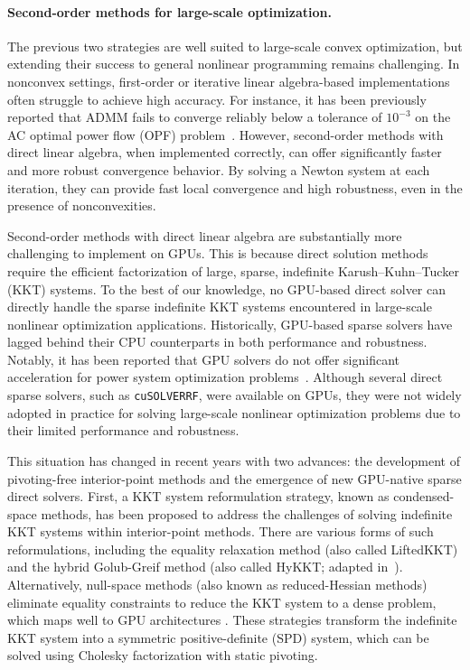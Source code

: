 \documentclass[smallextended]{svjour3}
\begin{document}
\paragraph{Second-order methods for large-scale optimization.}
The previous two strategies are well suited to large-scale convex optimization, but extending their success to general nonlinear programming remains challenging.
In nonconvex settings, first-order or iterative linear algebra-based implementations often struggle to achieve high accuracy.
For instance, it has been previously reported that ADMM fails to converge reliably below a tolerance of $10^{-3}$ on the AC optimal power flow (OPF) problem~\cite{kimLeveragingGPUBatching2021}.
However, second-order methods with direct linear algebra, when implemented correctly, can offer significantly faster and more robust convergence behavior.
By solving a Newton system at each iteration, they can provide fast local convergence and high robustness, even in the presence of nonconvexities.

Second-order methods with direct linear algebra are substantially more challenging to implement on GPUs.
This is because direct solution methods require the efficient factorization of large, sparse, indefinite Karush–Kuhn–Tucker (KKT) systems.
To the best of our knowledge, no GPU-based direct solver can directly handle the sparse indefinite KKT systems encountered in large-scale nonlinear optimization applications.
Historically, GPU-based sparse solvers have lagged behind their CPU counterparts in both performance and robustness.
Notably, it has been reported that GPU solvers do not offer significant acceleration for power system optimization problems~\cite{swirydowicz2021linear,tasseff2019exploring}.
Although several direct sparse solvers, such as {\tt cuSOLVERRF}, were available on GPUs, they were not widely adopted in practice for solving large-scale nonlinear optimization problems due to their limited performance and robustness.

This situation has changed in recent years with two advances: the development of pivoting-free interior-point methods and the emergence of new GPU-native sparse direct solvers.
First, a KKT system reformulation strategy, known as condensed-space methods, has been proposed to address the challenges of solving indefinite KKT systems within interior-point methods.
There are various forms of such reformulations, including the equality relaxation method (also called LiftedKKT) and the hybrid Golub-Greif method (also called HyKKT; adapted in~\cite{regev2023hykkt}).
Alternatively, null-space methods (also known as reduced-Hessian methods) eliminate equality constraints to reduce the KKT system to a dense problem, which maps well to GPU architectures \cite{pacaud2022condensed}.
These strategies transform the indefinite KKT system into a symmetric positive-definite (SPD) system, which can be solved using Cholesky factorization with static pivoting.
\end{document}
